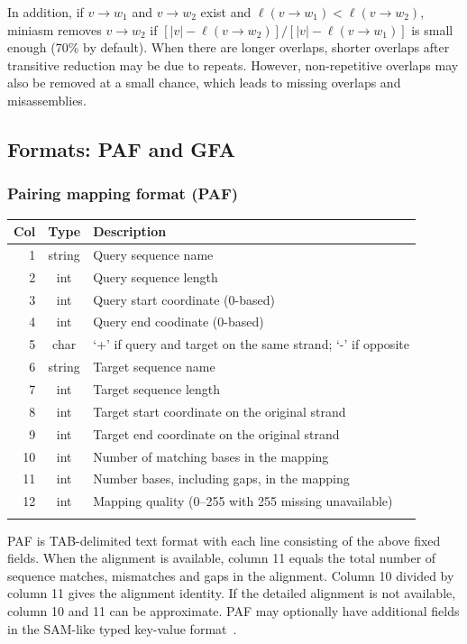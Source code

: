 \documentclass{bioinfo}
\begin{document}
\begin{methods}
In addition, if $v\to w_1$ and $v\to w_2$ exist and $\ell(v\to w_1)<\ell(v\to
w_2)$, miniasm removes $v\to w_2$ if $[|v|-\ell(v\to w_2)]/[|v|-\ell(v\to
w_1)]$ is small enough (70\% by default). When there are longer overlaps,
shorter overlaps after transitive reduction may be due to repeats.
However, non-repetitive overlaps may also be removed at a small chance, which
leads to missing overlaps and misassemblies.

\subsection{Formats: PAF and GFA}

\subsubsection{Pairing mapping format (PAF)}

\begin{table}[tb]\label{tab:paf}
{\footnotesize
\begin{tabular}{rcl}
\toprule
Col & Type & Description \\
\midrule
1 & string & Query sequence name \\
2 & int    & Query sequence length \\
3 & int    & Query start coordinate (0-based) \\
4 & int    & Query end coodinate (0-based) \\
5 & char   & `+' if query and target on the same strand; `-' if opposite \\
6 & string & Target sequence name \\
7 & int    & Target sequence length \\
8 & int    & Target start coordinate on the original strand \\
9 & int    & Target end coordinate on the original strand \\
10& int    & Number of matching bases in the mapping \\
11& int    & Number bases, including gaps, in the mapping \\
12& int    & Mapping quality (0--255 with 255 missing unavailable) \\
\botrule
\end{tabular}
}{PAF is TAB-delimited text format with each line consisting of the above fixed
fields. When the alignment is available, column 11 equals the total number of
sequence matches, mismatches and gaps in the alignment. Column 10 divided by
column 11 gives the alignment identity. If the detailed alignment is not
available, column 10 and 11 can be approximate. PAF may optionally have
additional fields in the SAM-like typed key-value format~\citep{Li:2009ys}.}
\end{table}


\end{methods}
\end{document}
